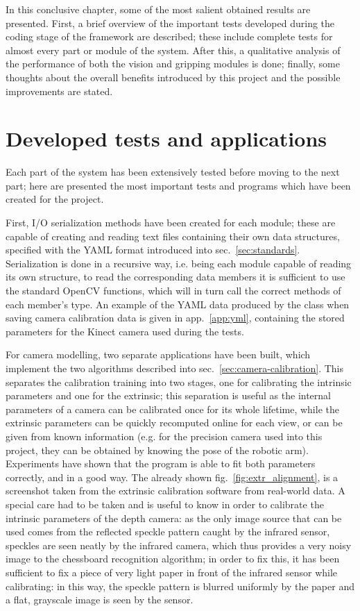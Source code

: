 In this conclusive chapter, some of the most salient obtained results
are presented. First, a brief overview of the important tests
developed during the coding stage of the framework are described;
these include complete tests for almost every part or module of the
system. After this, a qualitative analysis of the performance of both
the vision and gripping modules is done; finally, some thoughts about
the overall benefits introduced by this project and the possible
improvements are stated. 

\section{Developed tests and applications}
Each part of the system has been extensively tested before moving to
the next part; here are presented the most important tests and
programs which have been created for the project. 

First, I/O serialization methods have been created for each module;
these are capable of creating and reading text files containing their
own data structures, specified with the YAML format introduced into
sec.~\ref{sec:standards}. Serialization is done in a recursive way, i.e. being
each module capable of reading its own structure, to read the
corresponding data members it is sufficient to use the standard OpenCV
functions, which will in turn call the correct methods of each
member's type. An example of the YAML data produced by
the  class when saving camera calibration data is given in
app.~\ref{app:yml}, containing the stored parameters for the Kinect
camera used during the tests. 

For camera modelling, two separate applications have been built, which
implement the two algorithms described into
sec.~\ref{sec:camera-calibration}. This separates the calibration
training into two stages, one for calibrating the intrinsic parameters
and one for the extrinsic; this separation is useful as the internal
parameters of a camera can be calibrated once for its whole lifetime,
while the  extrinsic parameters can be quickly recomputed online for
each view, or can be given from known information (e.g. for the
precision camera used into this project, they can be obtained by
knowing the pose of the robotic arm). Experiments have shown that the
program is able to fit both parameters correctly, and in a good
way. The already shown fig.~\ref{fig:extr_alignment}, is a screenshot
taken from the extrinsic calibration software from real-world data. A
special care had to be taken and is useful to know in order to
calibrate the intrinsic parameters of the depth camera: as the only
image source that can be used comes from the reflected speckle pattern
caught by the infrared sensor, speckles are seen neatly by the
infrared camera, which thus provides a very noisy image to the
chessboard recognition algorithm; in order to fix this, it has been
sufficient to fix a piece of very light paper in front of the infrared
sensor while calibrating: in this way, the speckle pattern is blurred
uniformly by the paper and a flat, grayscale image is seen by the sensor.

